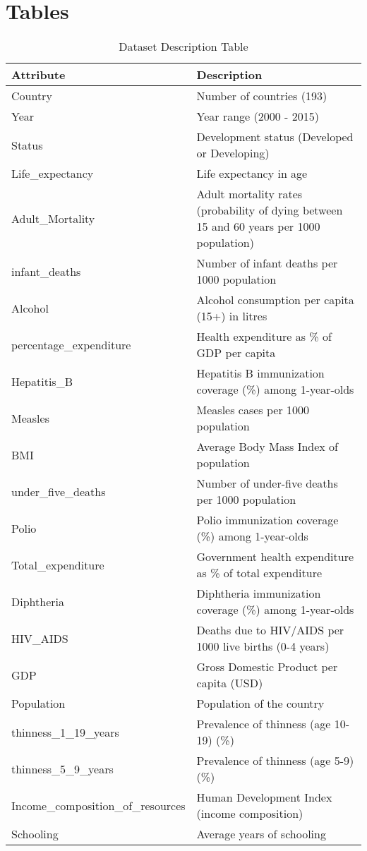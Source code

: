 \documentclass[11pt]{article}
\begin{document}
\section{Tables}

\begin{table*}[t]
\centering
\begin{tabular}{|p{}|p{}|}
\hline
\textbf{Attribute} & \textbf{Description} \\ \hline
Country & Number of countries (193) \\ \hline
Year & Year range (2000 - 2015) \\ \hline
Status & Development status (Developed or Developing) \\ \hline
Life\_expectancy & Life expectancy in age \\ \hline
Adult\_Mortality & Adult mortality rates (probability of dying between 15 and 60 years per 1000 population) \\ \hline
infant\_deaths & Number of infant deaths per 1000 population \\ \hline
Alcohol & Alcohol consumption per capita (15+) in litres \\ \hline
percentage\_expenditure & Health expenditure as \% of GDP per capita \\ \hline
Hepatitis\_B & Hepatitis B immunization coverage (\%) among 1-year-olds \\ \hline
Measles & Measles cases per 1000 population \\ \hline
BMI & Average Body Mass Index of population \\ \hline
under\_five\_deaths & Number of under-five deaths per 1000 population \\ \hline
Polio & Polio immunization coverage (\%) among 1-year-olds \\ \hline
Total\_expenditure & Government health expenditure as \% of total expenditure \\ \hline
Diphtheria & Diphtheria immunization coverage (\%) among 1-year-olds \\ \hline
HIV\_AIDS & Deaths due to HIV/AIDS per 1000 live births (0-4 years) \\ \hline
GDP & Gross Domestic Product per capita (USD) \\ \hline
Population & Population of the country \\ \hline
thinness\_1\_19\_years & Prevalence of thinness (age 10-19) (\%) \\ \hline
thinness\_5\_9\_years & Prevalence of thinness (age 5-9) (\%) \\ \hline
Income\_composition\_of\_resources & Human Development Index (income composition) \\ \hline
Schooling & Average years of schooling \\ \hline
\end{tabular}
\caption{Dataset Description Table}
\label{append:1}
\end{table*}
\end{document}
